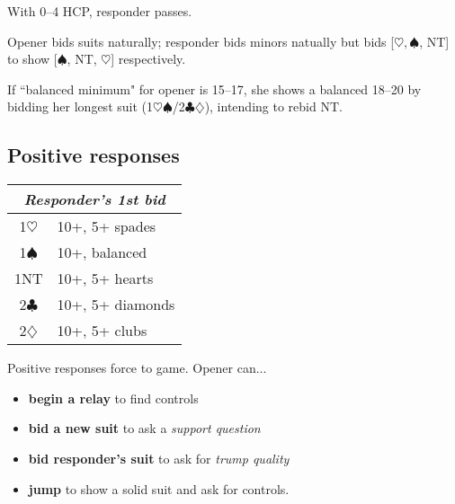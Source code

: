 \documentclass[a4paper, twoside, 11pt]{article}
\begin{document}
\begin{multicols}{3}
\begin{center}
\begin{tabular}{ |c|l| }
 \hline
\end{tabular}
\end{center}

With 0--4 HCP, responder passes.

Opener bids suits naturally; responder bids minors natually but bids [$\heartsuit, \spadesuit$, NT] to show [$\spadesuit$, NT, $\heartsuit$] respectively.

If ``balanced minimum" for opener is 15--17, she shows a balanced 18--20 by bidding her longest suit (1$\heartsuit\spadesuit$/2$\clubsuit\diamondsuit$), intending to rebid NT.





\subsection*{Positive responses}

\begin{center}
\begin{tabular}{ |c|l| }
 \hline
 \multicolumn{2}{|c|}{\textit{Responder's 1st bid}} \\
 \hline
 1$\heartsuit$ & 10+, 5+ spades\\
 1$\spadesuit$ & 10+,  balanced\\
 1NT& 10+, 5+ hearts\\
 2$\clubsuit$ & 10+, 5+ diamonds\\
 2$\diamondsuit$ & 10+, 5+ clubs\\
 \hline
\end{tabular}
\end{center}
 Positive responses force to game. Opener can... 
 \begin{itemize}
     \item \textbf{begin a relay} to find controls
     \item \textbf{bid a new suit} to ask a \textit{support question}
     \item \textbf{bid responder's suit} to ask for \textit{trump quality}
     \item \textbf{jump} to show a solid suit and ask for controls.
 \end{itemize}


\end{multicols}
\end{document}
